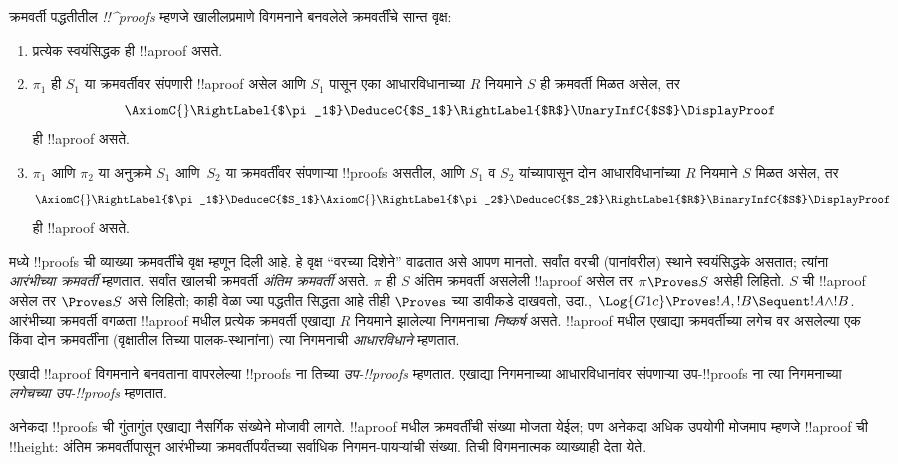 \documentclass[../../../include/open-logic-section]{subfiles}
\begin{document}
\begin{defn}
क्रमवर्ती पद्धतीतील \emph{!!^{proof}s} म्हणजे खालीलप्रमाणे
विगमनाने बनवलेले क्रमवर्तींचे सान्त वृक्ष:
\begin{enumerate}
  \item{} प्रत्येक स्वयंसिद्धक ही !!a{proof} असते.
  \item{} $\pi_1$ ही $S_1$ या क्रमवर्तीवर
  संपणारी !!a{proof} असेल आणि $S_1$ पासून एका आधारविधानाच्या
  $R$ नियमाने $S$ ही क्रमवर्ती मिळत असेल, तर
  \[
  \AxiomC{}
  \RightLabel{$\pi_1$}
  \DeduceC{$S_1$}
  \RightLabel{$R$}
  \UnaryInfC{$S$}
  \DisplayProof
  \]
  ही !!a{proof} असते.
  \item{} $\pi_1$ आणि $\pi_2$ या
  अनुक्रमे $S_1$ आणि~$S_2$ या क्रमवर्तींवर संपणाऱ्या !!{proof}s
  असतील, आणि $S_1$ व $S_2$ यांच्यापासून दोन आधारविधानांच्या $R$ नियमाने
  $S$ मिळत असेल, तर
  \[
  \AxiomC{}
  \RightLabel{$\pi_1$}
  \DeduceC{$S_1$}
  \AxiomC{}
  \RightLabel{$\pi_2$}
  \DeduceC{$S_2$}
  \RightLabel{$R$}
  \BinaryInfC{$S$}
  \DisplayProof
  \]
  ही !!a{proof} असते.
\end{enumerate}
\end{defn}

 मध्ये !!{proof}s ची व्याख्या क्रमवर्तींचे वृक्ष म्हणून
दिली आहे. हे वृक्ष ``वरच्या दिशेने'' वाढतात असे आपण मानतो.
सर्वांत वरची (पानांवरील) स्थाने स्वयंसिद्धके असतात; त्यांना
\emph{आरंभीच्या क्रमवर्ती} म्हणतात. सर्वांत खालची क्रमवर्ती
\emph{अंतिम क्रमवर्ती} असते. $\pi$ ही $S$ अंतिम क्रमवर्ती
असलेली !!a{proof} असेल तर $\pi \Proves S$ असेही लिहितो.
$S$ ची !!a{proof} असेल तर $\Proves S$ असे लिहितो; काही वेळा
ज्या पद्धतीत सिद्धता आहे तीही $\Proves$ च्या डावीकडे दाखवतो,
उदा., $\Log{G1c} \Proves !A, !B \Sequent !A \land
!B$. आरंभीच्या क्रमवर्ती वगळता !!a{proof} मधील प्रत्येक
क्रमवर्ती एखाद्या $R$ नियमाने झालेल्या निगमनाचा
\emph{निष्कर्ष} असते. !!a{proof} मधील एखाद्या क्रमवर्तीच्या
लगेच वर असलेल्या एक किंवा दोन क्रमवर्तींना (वृक्षातील तिच्या
पालक-स्थानांना) त्या निगमनाची \emph{आधारविधाने} म्हणतात.

एखादी !!a{proof} विगमनाने बनवताना वापरलेल्या !!{proof}s ना तिच्या
\emph{उप-!!{proof}s} म्हणतात. एखाद्या निगमनाच्या आधारविधानांवर
संपणाऱ्या उप-!!{proof}s ना त्या निगमनाच्या \emph{लगेचच्या
उप-!!{proof}s} म्हणतात.

अनेकदा !!{proof}s ची गुंतागुंत एखाद्या नैसर्गिक संख्येने
मोजावी लागते. !!a{proof} मधील क्रमवर्तींची संख्या मोजता येईल;
पण अनेकदा अधिक उपयोगी मोजमाप म्हणजे !!a{proof} ची !!{height}:
अंतिम क्रमवर्तीपासून आरंभीच्या क्रमवर्तीपर्यंतच्या सर्वाधिक
निगमन-पायऱ्यांची संख्या. तिची विगमनात्मक व्याख्याही देता येते.
\end{document}
